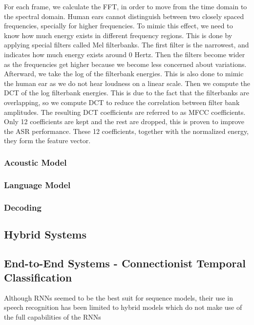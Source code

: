 For each frame, we calculate the \ac{FFT}, in order to move from the time domain to the spectral domain. Human ears cannot distinguish between two closely spaced frequencies, specially for higher frequencies. To mimic this effect, we need to know how much energy exists in different frequency regions. This is done by applying special filters called Mel filterbanks. The first filter is the narrowest, and indicates how much energy exists around 0 Hertz. Then the filters become wider as the frequencies get higher because we become less concerned about variations. 
Afterward, we take the log of the filterbank energies. This is also done to mimic the human ear as we do not hear loudness on a linear scale. 
Then we compute the \ac{DCT} of the log filterbank energies. This is due to the fact that the filterbanks are overlapping, so we compute \ac{DCT} to reduce the correlation between filter bank amplitudes. The resulting \ac{DCT} coefficients are referred to as MFCC coefficients. Only 12 coefficients are kept and the rest are dropped, this is proven to improve the \ac{ASR} performance. These 12 coefficients, together with the normalized energy, they form the feature vector.

\subsubsection{Acoustic Model} 
\label{bg:sub5}

\subsubsection{Language Model} 
\label{bg:sub5}

\subsubsection{Decoding} 
\label{bg:sub5}

\subsection{Hybrid Systems} 
\label{bg:sub7}


\subsection{End-to-End Systems - Connectionist Temporal Classification \cite{graves2006connectionist}} 
\label{bg:sub7}

Although \ac{RNN}s seemed to be the best suit for sequence models, their use in speech recognition has been limited to hybrid models which do not make use of the full capabilities of the \ac{RNN}s

